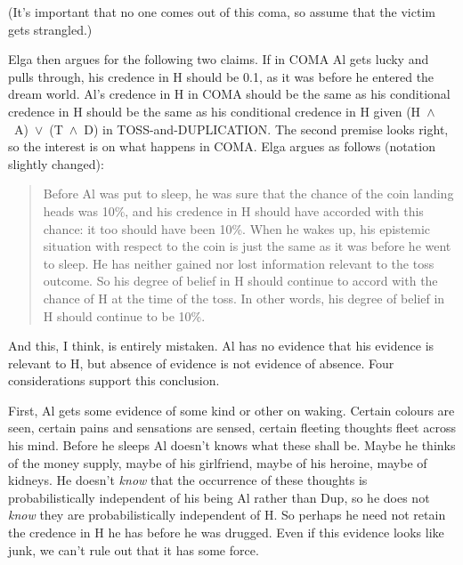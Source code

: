 \noindent (It's important that no one comes out of this coma, so assume that the victim gets strangled.)

Elga then argues for the following two claims. If in COMA Al gets lucky and pulls through, his credence in H should be 0.1, as it was before he entered the dream world. Al's credence in H in COMA should be the same as his conditional credence in H should be the same as his conditional credence in H given (H~${\wedge}$~A)~${\vee}$~(T~${\wedge}$~D) in TOSS-and-DUPLICATION. The second premise looks right, so the interest is on what happens in COMA. Elga argues as follows (notation slightly changed):

\begin{quote}
Before Al was put to sleep, he was sure that the chance of the coin landing heads was 10\%, and his credence in H should have accorded with this chance: it too should have been 10\%. When he wakes up, his epistemic situation with respect to the coin is just the same as it was before he went to sleep. He has neither gained nor lost information relevant to the toss outcome. So his degree of belief in H should continue to accord with the chance of H at the time of the toss. In other words, his degree of belief in H should continue to be 10\%.
\end{quote}

\noindent And this, I think, is entirely mistaken. Al has no evidence that his evidence is relevant to H, but absence of evidence is not evidence of absence. Four considerations support this conclusion.

First, Al gets some evidence of some kind or other on waking. Certain colours are seen, certain pains and sensations are sensed, certain fleeting thoughts fleet across his mind. Before he sleeps Al doesn't knows what these shall be. Maybe he thinks of the money supply, maybe of his girlfriend, maybe of his heroine, maybe of kidneys. He doesn't \textit{know} that the occurrence of these thoughts is probabilistically independent of his being Al rather than Dup, so he does not \textit{know} they are probabilistically independent of H. So perhaps he need not retain the credence in H he has before he was drugged. Even if this evidence looks like junk, we can't rule out that it has some force. 

